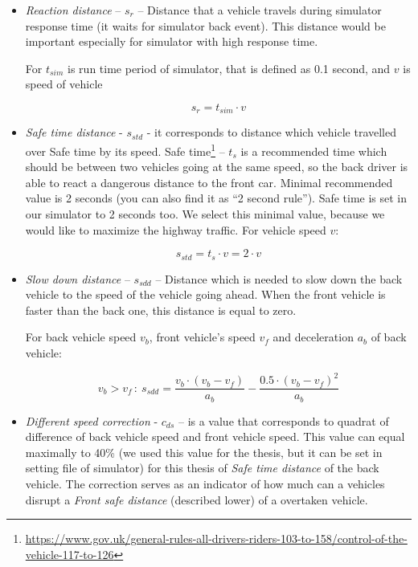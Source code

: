 \begin{itemize}
\item \textit{Reaction distance} – $s_r$ – Distance that a vehicle travels during simulator response time (it waits for simulator back event). This distance would be important especially for simulator with high response time.

For $t_{sim}$ is run time period of simulator, that is defined as 0.1 second, and $v$ is speed of vehicle

\begin{equation}
s_{r}=t_{sim}\cdot v\label{eq:sr}
\end{equation}

\item \textit{Safe time distance} - $s_{std}$ -  it corresponds to distance which vehicle travelled over Safe time by its speed. Safe time\footnote{\url{https://www.gov.uk/general-rules-all-drivers-riders-103-to-158/control-of-the-vehicle-117-to-126}} – $t_{s}$ is a recommended time which should be between two vehicles going at the same speed, so the back driver is able to react a dangerous distance to the front car. Minimal recommended value is 2 seconds (you can also find it as “2 second rule”). Safe time is set in our simulator to 2 seconds too. We select this minimal value, because we would like to maximize  the highway traffic. For vehicle speed $v$:

\begin{equation}
s_{std}=t_{s}\cdot v=2\cdot v\label{eq:std}
\end{equation}

\item \textit{Slow down distance} – $s_{sdd}$ – Distance which is needed to slow down the back vehicle to the speed of the vehicle going ahead. When the front vehicle is faster than the back one, this distance is equal to zero.

For back vehicle speed $v_b$, front vehicle’s speed $v_f$ and deceleration $a_b$ of back vehicle:

\begin{equation}
v_{b}>v_{f\:}:\:s_{sdd}=\frac{v_{b}\cdot(v_{b}-v_{f})}{a_{b}}-\frac{0.5\cdot(v_{b}-v_{f})^{2}}{a_{b}}\label{eq:ssdd}
\end{equation}

\item \textit{Different speed correction} - $c_{ds}$ – is a value that corresponds to quadrat of difference of back vehicle speed and front vehicle speed. This value can equal maximally to 40\% (we used this value for the thesis, but it can be set in setting file of simulator) for this thesis of \textit{Safe time distance} of the back vehicle. The correction serves as an indicator of how much can a vehicles disrupt a \textit{Front safe distance} (described lower) of a overtaken vehicle.


\end{itemize}
